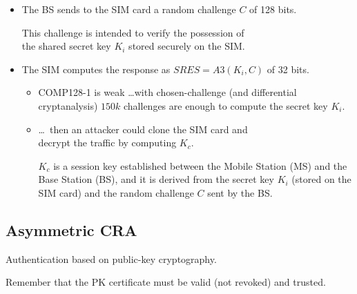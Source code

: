 \begin{itemize}
    \item The BS sends to the SIM card a random challenge $C$ of 128 bits. 
    
    \hspace*{1cm} This challenge is intended to verify the possession of \\ \hspace*{3cm} the shared secret key  $K_i$  stored securely on the SIM.
    \item The SIM computes the response as $SRES = A3(K_{i}, C)$ of 32 bits.
    \begin{itemize}
        \item COMP128-1 is weak \dots with chosen-challenge (and differential cryptanalysis) $150k$ challenges are enough to compute the secret key $K_i$.
        \item \dots\ then an attacker could clone the SIM card and \\\hspace*{4cm} decrypt the traffic by computing $K_c$.
        
        $K_c$  is a session key established between the Mobile Station (MS) and the Base Station (BS), and it is derived from the secret key  $K_i$  (stored on the SIM card) and the random challenge $C$  sent by the BS.
    \end{itemize}
\end{itemize}

\subsection{Asymmetric CRA}
\begin{center}
    Authentication based on public-key cryptography.

    Remember that the PK certificate must be valid (not revoked) and trusted.
\end{center}


